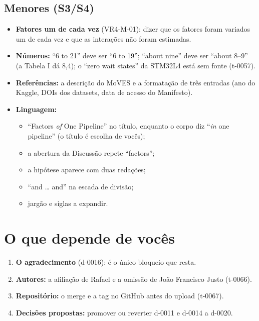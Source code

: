 \documentclass[10pt,a4paper]{article}
\begin{document}
\subsection{Menores (S3/S4)}
\begin{itemize}
\item \textbf{Fatores um de cada vez} (VR4-M-01): dizer que os fatores foram variados um de cada vez e que as interações não foram estimadas.
\item \textbf{Números:} ``6 to 21'' deve ser ``6 to 19''; ``about nine'' deve ser ``about 8--9'' (a Tabela I dá 8,4); o ``zero wait states'' da STM32L4 está sem fonte (t-0057).
\item \textbf{Referências:} a descrição do MoVES e a formatação de três entradas (ano do Kaggle, DOIs dos datasets, data de acesso do Manifesto).
\item \textbf{Linguagem:}
  \begin{itemize}
  \item ``Factors \emph{of} One Pipeline'' no título, enquanto o corpo diz ``\emph{in} one pipeline'' (o título é escolha de vocês);
  \item a abertura da Discussão repete ``factors'';
  \item a hipótese aparece com duas redações;
  \item ``and \ldots{} and'' na escada de divisão;
  \item jargão e siglas a expandir.
  \end{itemize}
\end{itemize}

\section{O que depende de vocês}
\begin{enumerate}
\item \textbf{O agradecimento} (d-0016): é o único bloqueio que resta.
\item \textbf{Autores:} a afiliação de Rafael e a omissão de João Francisco Justo (t-0066).
\item \textbf{Repositório:} o merge e a tag no GitHub antes do upload (t-0067).
\item \textbf{Decisões propostas:} promover ou reverter d-0011 e d-0014 a d-0020.
\end{enumerate}
\end{document}
